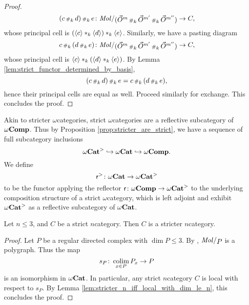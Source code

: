 \begin{proof}
    \begin{equation*}
        (c \cp{k} d) \cp{k} e \colon \molecin{(\dglobe{m} \cp{k} \dglobe{m'} \cp{k} \dglobe{m''})} \to C,
    \end{equation*}
    whose principal cell is \( (\langle c\rangle *_{k} \langle d\rangle) *_{k} \langle e\rangle \).
    Similarly, we have a pasting diagram
    \begin{equation*}
        c \cp{k} (d \cp{k} e) \colon \molecin{(\dglobe{m} \cp{k} \dglobe{m'} \cp{k} \dglobe{m''})} \to C,
    \end{equation*}
    whose principal cell is \( \langle c\rangle *_{k} (\langle d\rangle *_{k} \langle e\rangle) \).
    By Lemma \ref{lem:strict_functor_determined_by_basis}, 
    \begin{equation*}
         (c \,{\scriptstyle\#}_{k}\, d) \,{\scriptstyle\#}_{k}\, e = c \,{\scriptstyle\#}_{k}\, (d \,{\scriptstyle\#}_{k}\, e),
    \end{equation*}
    hence their principal cells are equal as well.
    Proceed similarly for exchange.
    This concludes the proof.
\end{proof} 

Akin to stricter \( \omega \)\nbd categories, strict \( \omega \)\nbd categories are a reflective subcategory of \( \omega\mathbf{Comp} \).
Thus by Proposition \ref{prop:stricter_are_strict}, we have a sequence of full subcategory inclusions
\begin{equation*}
     {\omega\mathbf{Cat}}^> \hookrightarrow {\omega\mathbf{Cat}} \hookrightarrow \omega\mathbf{Comp}.
\end{equation*}
We define
\begin{equation*}
    \mathsf{r}^{>} \colon {\omega\mathbf{Cat}} \to {\omega\mathbf{Cat}}^>
\end{equation*}
to be the functor applying the reflector \( \mathsf{r} \colon \omega\mathbf{Comp} \to {\omega\mathbf{Cat}}^>  \) to the underlying composition structure of a strict \( \omega \)\nbd category, which is left adjoint and exhibit \( {\omega\mathbf{Cat}}^> \) as a reflective subcategory of \( {\omega\mathbf{Cat}} \).


\begin{thm}\label{thm:strict_le_3_are_stricter}
    Let \( n \le 3 \), and \( C \) be a strict \( n \)\nbd category.
    Then \( C \) is a stricter \( n \)\nbd category.
\end{thm}
\begin{proof}
    Let \( P \) be a regular directed complex with \( \dim P \le 3 \).
    By \cite[Corollary 8.4.12]{hadzihasanovic2024combinatorics}, \( \molecin{P} \) is a polygraph.
    Thus the map
    \begin{equation*}
        s_P \colon \operatorname*{colim}_{x \in P} {P}_{x} \to P 
    \end{equation*}
    is an isomorphism in \( {\omega\mathbf{Cat}} \).
    In particular, any strict \( n \)\nbd category \( C \) is local with respect to \( s_P \).
    By Lemma \ref{lem:stricter_n_iff_local_with_dim_le_n}, this concludes the proof.
\end{proof}



